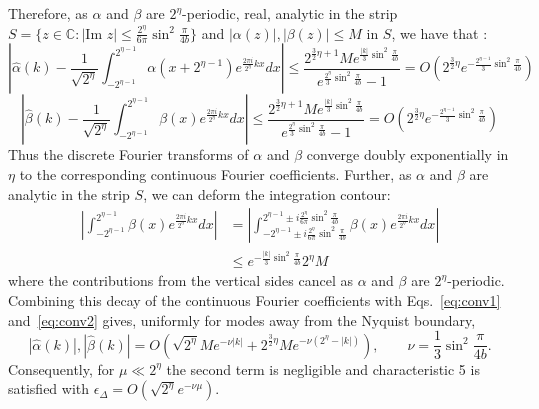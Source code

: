 \documentclass[aps,floatfix,10pt,amssymb,amsfont,amsmath,superscriptaddress,float,nofootinbib,longbibliography,nobalancelastpage,twocolumn]{revtex4-2}
\begin{document}
Therefore, as $\alpha$ and $\beta$ are $2^{\eta}$-periodic, real, analytic in the strip $S =\{z \in \mathbb{C}: |\text{Im } z| \leq \frac{2^{\eta}}{6\pi}\sin^2\frac{\pi}{4b}\}$ and $|\alpha(z)|, |\beta(z)| \leq M$ in $S$, we have that \cite{trefethen2014exponentially}:
\begin{equation}
\label{eq:conv1}
    \left|\hat\alpha(k) - \frac{1}{\sqrt{2^{\eta}}}\int_{-2^{\eta-1}}^{2^{\eta-1}}\alpha(x+2^{\eta-1})e^{\frac{2\pi i}{2^{\eta}}kx} dx\right| \leq \frac{2^{\frac{3}{2}\eta+1} Me^{\frac{|k|}{3}\sin^2 \frac{\pi}{4b}}}{e^{\frac{2^{\eta}}{3}\sin^2 \frac{\pi}{4b}}-1} = O(2^{\frac{3}{2}\eta}e^{-\frac{2^{\eta-1}}{3}\sin^2 \frac{\pi}{4b}})
\end{equation}
\begin{equation}
\label{eq:conv2}
    \left|\hat\beta(k) - \frac{1}{\sqrt{2^{\eta}}}\int_{-2^{\eta-1}}^{2^{\eta-1}}\beta(x)e^{\frac{2\pi i}{2^{\eta}}kx} dx\right| \leq  \frac{2^{\frac{3}{2}\eta+1}Me^{\frac{|k|}{3}\sin^2 \frac{\pi}{4b}}}{e^{\frac{2^{\eta}}{3}\sin^2 \frac{\pi}{4b}}-1}= O(2^{\frac{3}{2}\eta}e^{-\frac{2^{\eta-1}}{3}\sin^2 \frac{\pi}{4b}})
\end{equation}
Thus the discrete Fourier transforms of $\alpha$ and $\beta$ converge doubly exponentially in $\eta$ to the corresponding continuous Fourier coefficients. Further, as $\alpha$ and $\beta$ are analytic in the strip $S$, we can deform the integration contour:
\begin{align}
    \left|\int_{-2^{\eta-1}}^{2^{\eta-1}}\beta(x)e^{\frac{2\pi i}{2^{\eta}}kx} dx\right| &=\left| \int_{-2^{\eta-1}\pm i\frac{2^{\eta}}{6\pi}\sin^2\frac{\pi}{4b}}^{2^{\eta-1}\pm i\frac{2^{\eta}}{6\pi}\sin^2\frac{\pi}{4b}}\beta(x)e^{\frac{2\pi i}{2^{\eta}}kx} dx\right|\\
    &\leq e^{-\frac{|k|}{3}\sin^2 \frac{\pi}{4b}}2^{\eta}M
    \label{eq:tails}
\end{align}
where the contributions from the vertical sides cancel as $\alpha$ and $\beta$ are $2^{\eta}$-periodic. Combining this decay of the continuous Fourier coefficients with Eqs.~\eqref{eq:conv1} and~\eqref{eq:conv2} gives, uniformly for modes away from the Nyquist boundary,
\begin{equation}
\label{eq:exactdecay}
    |\hat \alpha(k)|, |\hat \beta(k)| = O\!\left(\sqrt{2^{\eta}}M e^{-\nu|k|}
    +2^{\frac{3}{2}\eta}M e^{-\nu(2^{\eta}-|k|)}\right),
    \qquad \nu=\frac13\sin^2\frac{\pi}{4b}.
\end{equation}
Consequently, for $\mu\ll 2^{\eta}$ the second term is negligible and characteristic 5 is satisfied with $\epsilon_{\Delta}=O(\sqrt{2^{\eta}}e^{-\nu\mu})$.
\end{document}
